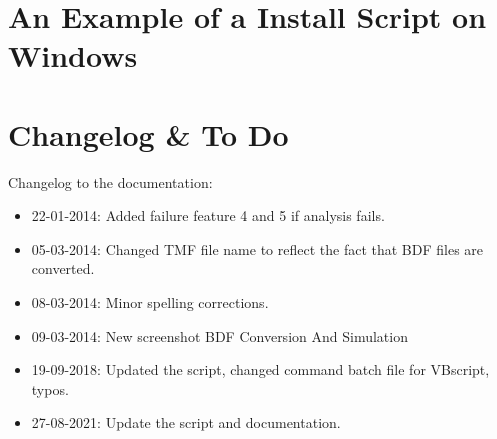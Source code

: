 \documentclass[11pt,a4paper,final,oneside,titlepage,fleqn]{article}
\begin{document}
\newpage
\section{An Example of a Install Script on Windows}
\label{app:installscript}
%


\newpage

\newpage
\section{Changelog \& To Do}
\label{app:changelogandtodo}
Changelog to the documentation:

\begin{itemize}\itemsep0pt
\item[]22-01-2014: Added failure feature 4 and 5 if analysis fails.
\item[]05-03-2014: Changed TMF file name to reflect the fact that BDF files
                   are converted.
\item[]08-03-2014: Minor spelling corrections.
\item[]09-03-2014: New screenshot BDF Conversion And Simulation
\item[]19-09-2018: Updated the script, changed command batch file for VBscript, typos.
\item[]27-08-2021: Update the script and documentation.
\end{itemize}






\newpage
%
%
\printbibliography
\end{document}
